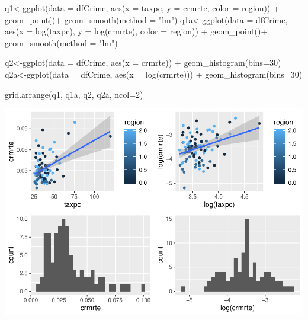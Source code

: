 \documentclass[]{article}
\newenvironment{Shaded}{}{}
\newcommand{\DataTypeTok}[1]{#1}
\newcommand{\DecValTok}[1]{#1}
\newcommand{\KeywordTok}[1]{\textcolor[rgb]{0.00,0.00,1.00}{#1}}
\newcommand{\NormalTok}[1]{#1}
\newcommand{\OperatorTok}[1]{#1}
\newcommand{\StringTok}[1]{\textcolor[rgb]{0.00,0.50,0.50}{#1}}
\begin{document}
\begin{Shaded}
\begin{Highlighting}[]
\NormalTok{q1<-}\KeywordTok{ggplot}\NormalTok{(}\DataTypeTok{data =}\NormalTok{ dfCrime, }\KeywordTok{aes}\NormalTok{(}\DataTypeTok{x =}\NormalTok{ taxpc, }\DataTypeTok{y =}\NormalTok{ crmrte, }\DataTypeTok{color =}\NormalTok{ region)) }\OperatorTok{+}\StringTok{ }
\StringTok{      }\KeywordTok{geom_point}\NormalTok{()}\OperatorTok{+}
\StringTok{  }\KeywordTok{geom_smooth}\NormalTok{(}\DataTypeTok{method =} \StringTok{"lm"}\NormalTok{)}
\NormalTok{q1a<-}\KeywordTok{ggplot}\NormalTok{(}\DataTypeTok{data =}\NormalTok{ dfCrime, }\KeywordTok{aes}\NormalTok{(}\DataTypeTok{x =} \KeywordTok{log}\NormalTok{(taxpc), }\DataTypeTok{y =} \KeywordTok{log}\NormalTok{(crmrte), }\DataTypeTok{color =}\NormalTok{ region)) }\OperatorTok{+}\StringTok{ }
\StringTok{      }\KeywordTok{geom_point}\NormalTok{()}\OperatorTok{+}
\StringTok{  }\KeywordTok{geom_smooth}\NormalTok{(}\DataTypeTok{method =} \StringTok{"lm"}\NormalTok{)}

\NormalTok{q2<-}\KeywordTok{ggplot}\NormalTok{(}\DataTypeTok{data =}\NormalTok{ dfCrime, }\KeywordTok{aes}\NormalTok{(}\DataTypeTok{x =}\NormalTok{ crmrte)) }\OperatorTok{+}\StringTok{ }
\StringTok{      }\KeywordTok{geom_histogram}\NormalTok{(}\DataTypeTok{bins=}\DecValTok{30}\NormalTok{)}
\NormalTok{q2a<-}\KeywordTok{ggplot}\NormalTok{(}\DataTypeTok{data =}\NormalTok{ dfCrime, }\KeywordTok{aes}\NormalTok{(}\DataTypeTok{x =} \KeywordTok{log}\NormalTok{(crmrte))) }\OperatorTok{+}\StringTok{ }
\StringTok{      }\KeywordTok{geom_histogram}\NormalTok{(}\DataTypeTok{bins=}\DecValTok{30}\NormalTok{)}

\KeywordTok{grid.arrange}\NormalTok{(q1, q1a, q2, q2a, }\DataTypeTok{ncol=}\DecValTok{2}\NormalTok{)}
\end{Highlighting}
\end{Shaded}

\includegraphics{Bagnard_Gaustad_Hartman_Leung_Lab_3_files/figure-latex/unnamed-chunk-56-1.pdf}
\end{document}
